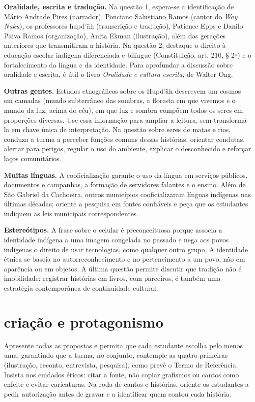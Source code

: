 \textbf{Oralidade, escrita e tradução.} Na questão 1,
espera-se a identificação de Mário Andrade Pires (narrador), Ponciano
Salustiano Ramos (cantor do \textit{Way Naku}), os professores hupd'äh
(transcrição e tradução), Patience Epps e Danilo Paiva Ramos
(organização), Anita Ekman (ilustração), além das gerações anteriores
que transmitiram a história. Na questão 2, destaque o direito à educação
escolar indígena diferenciada e bilíngue (Constituição, art. 210, § 2º)
e o fortalecimento da língua e da identidade. Para aprofundar a
discussão sobre oralidade e escrita, é útil o livro \textit{Oralidade e
cultura escrita}, de Walter Ong.

\textbf{Outras gentes.} Estudos etnográficos sobre os Hupd'äh
descrevem um cosmos em camadas (mundo subterrâneo das sombras, a floresta
em que vivemos e o mundo da luz, acima do céu), em que luz e sombra
compõem todos os seres em proporções diversas. Use essa informação para
ampliar a leitura, sem transformá-la em chave única de interpretação.
Na questão sobre seres de matas e rios, conduza a turma a perceber
funções comuns dessas histórias: orientar condutas, alertar para
perigos, regular o uso do ambiente, explicar o desconhecido e reforçar
laços comunitários.

\textbf{Muitas línguas.} A cooficialização garante o uso da
língua em serviços públicos, documentos e campanhas, a formação de
servidores falantes e o ensino. Além de São Gabriel da Cachoeira, outros
municípios cooficializaram línguas indígenas nas últimas décadas;
oriente a pesquisa em fontes confiáveis e peça que os estudantes
indiquem as leis municipais correspondentes.

\textbf{Estereótipos.} A frase sobre o celular é
preconceituosa porque associa a identidade indígena a uma imagem
congelada no passado e nega aos povos indígenas o direito de usar
tecnologias, como qualquer outro grupo. A identidade étnica se baseia no
autorreconhecimento e no pertencimento a um povo, não em aparência ou
em objetos. A última questão permite discutir que tradição não é
imobilidade: registrar histórias em livros, com parceiros, é também uma
estratégia contemporânea de continuidade cultural.

\section{criação e protagonismo}

Apresente todas as propostas e permita que cada estudante escolha pelo
menos uma, garantindo que a turma, no conjunto, contemple as quatro
primeiras (ilustração, reconto, entrevista, pesquisa), como prevê o
Termo de Referência. Insista nos cuidados éticos: citar a fonte, não
copiar grafismos ou cantos como enfeite e evitar caricaturas. Na roda de
cantos e histórias, oriente os estudantes a pedir autorização antes de
gravar e a identificar quem contou cada história.

